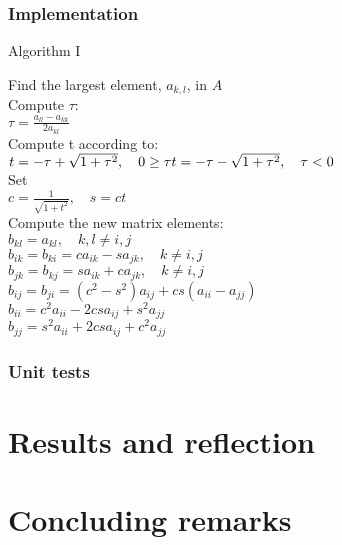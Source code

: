 \documentclass[11pt,a4paper,english]{article}
\numberwithin{equation}{section}
\begin{document}
\subsubsection{Implementation}

\centerline{Algorithm I}
\begin{tcolorbox}
Find the largest element, $a_{k,l}$, in $A$ \\
Compute $\tau:$ \\
$ \tau = \frac{a_{ll}-a_{kk}}{2a_{kl}}$ \\
Compute t according to:  \\
$t=  -\tau + \sqrt{1+\tau^2}, \quad   0  \geq \tau \\
t=  -\tau - \sqrt{1+\tau^2}, \quad   \tau <  0 $ \\
Set \\
$ c= \frac{1}{\sqrt{1+t^2}}, \quad s= ct$ \\
Compute the new matrix elements: \\
$ b_{kl} = a_{kl}, \quad k,l \neq i,j$ \\
$ b_{ik} = b_{ki} = ca_{ik}-sa_{jk}, \quad k \neq i,j$ \\
$ b_{jk} = b_{kj} = sa_{ik}+ca_{jk}, \quad k \neq i,j$ \\
$ b_{ij} = b_{ji} = (c^2 - s^2)a_{ij} + cs(a_{ii}-a_{jj}) $ \\
$ b_{ii} = c^2 a_{ii} - 2csa_{ij} + s^2 a_{jj} $ \\
$ b_{jj} = s^2 a_{ii} + 2csa_{ij} + c^2 a_{jj} $ \\

\end{tcolorbox} 

\subsubsection{Unit tests}


\section{Results and reflection}

\section{Concluding remarks }
\end{document}
